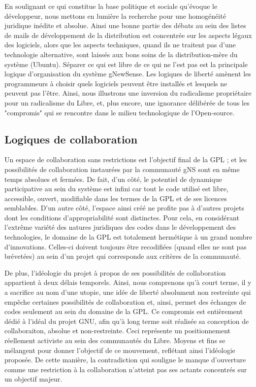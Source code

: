 En soulignant ce qui constitue la base politique et sociale qu'évoque le développeur, nous mettons en lumière la recherche pour une homogénéité juridique inédite et absolue. Ainsi une bonne partie des débats au sein des listes de mails de développement de la distribution est concentrée sur les aspects légaux des logiciels, alors que les aspects techniques, quand ils ne traitent pas d'une technologie alternative, sont laissés aux bons soins de la distribution-mère  du système (Ubuntu). Séparer ce qui est libre de ce qui ne l'est pas est la principale logique d'organisation du système gNewSense. Les logiques de liberté amènent les programmeurs à  choisir quels logiciels peuvent être installés et lesquels ne peuvent pas l'être. Ainsi, nous illustrons une inversion du radicalisme propriétaire pour un radicalisme du Libre, et, plus encore, une ignorance délibérée de tous les "compromis" qui se rencontre dans le milieu technologique de l'Open-source.

\subsection{Logiques de collaboration}\label{3.1.4}

Un espace de collaboration sans restrictions est l'objectif final de la GPL ; et les possibilités de collaboration instaurées par la communauté gNS sont en même temps absolues et fermées. De fait, d'un côté, le potentiel de dynamique participative au sein du système est infini car tout le code utilisé est libre, accessible, ouvert, modifiable dans les termes de la GPL et de ses licences semblables. D'un autre côté, l'espace ainsi créé ne profite pas à d'autres projets dont les conditions d'appropriabilité sont distinctes. Pour cela, en considérant l'extrême variété des natures juridiques des codes dans le développement des technologies, le domaine de la GPL est totalement hermétique à un grand nombre d'innovations. Celles-ci doivent toujours être recodifiées (quand elles ne sont pas brévetées) au sein d'un projet qui corresponde aux critères de la communauté.

De plus, l'idéologie du projet à propos de ses possibilités de collaboration appartient à deux délais temporels. Ainsi, nous comprenons qu'à court terme, il y a  sacrifice au nom d'une utopie, une idée de liberté absolument non restreinte qui empêche certaines possibilités de collaboration et, ainsi, permet des échanges de codes seulement au sein du domaine de la GPL. Ce compromis est entièrement dédié à l'idéal du projet GNU, afin qu'à long terme soit réalisée sa conception de collaboraiton, absolue et non-restreinte. Ceci représente un positionnement  réellement activiste au sein des communautés du Libre. Moyens et fins se mélangent pour donner l'objectif de ce mouvement, reflétant ainsi l'idéologie proposée. De cette manière, la contradiction qui souligne le manque d'ouverture comme une restriction à la collaboration n'atteint pas ses actants concentrés sur un objectif majeur.

